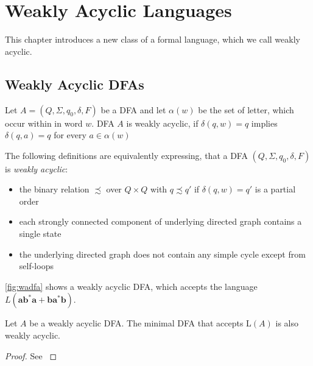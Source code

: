 \chapter{Weakly Acyclic Languages}\label{chapter:weakly_acyclic_language}

This chapter introduces a new class of a formal language, which we call weakly acyclic. 

\section{Weakly Acyclic DFAs}\label{sec:weakly_acyclic_dfa}

\begin{definition}
Let $A = (Q, \Sigma, q_{0},\delta,F)$ be a DFA and let $\alpha(w)$ be the set of letter, which occur within in word $w$. DFA $A$ is weakly acyclic, if $\delta(q,w) = q$ implies $\delta(q,a) = q$ for every $a \in \alpha(w)$
\end{definition}

The following definitions are equivalently expressing, that a DFA $(Q, \Sigma, q_{0},\delta,F)$ is \textit{weakly acyclic}:
\begin{itemize}[--,noitemsep]
	\item the binary relation $\precsim $  over $Q \times Q$ with $q \precsim q'$ if $\delta(q,w) = q'$ is a partial order
	\item each strongly connected component of underlying directed graph contains a single state 
	\item the underlying directed graph does not contain any simple cycle except from self-loops
\end{itemize}

\autoref{fig:wadfa} shows a weakly acyclic DFA, which accepts the language $L(\bm{ab^{*}a + ba^{*}b})$.

\begin{lemma}\label{lem:minimal}
Let $A$ be a weakly acyclic DFA. The minimal DFA that accepts L$(A)$ is also weakly acyclic. 
\end{lemma}

\begin{proof}
See {\cite[Proposition~4]{blondin_24}}
\end{proof}


